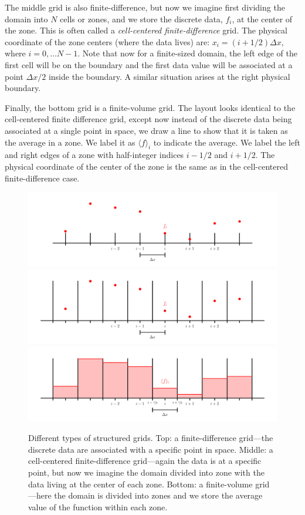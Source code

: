 The middle grid is also finite-difference, but now we imagine first
dividing the domain into $N$ cells or zones, and we store the discrete
data, $f_i$, at the center of the zone.  This is often called a {\em
  cell-centered finite-difference} grid.  The physical coordinate of
the zone centers (where the data lives) are: $x_i = (i + 1/2)\Delta
x$, where $i = 0, \ldots N-1$.  Note that now for a finite-sized
domain, the left edge of the first cell will be on the boundary and
the first data value will be associated at a point $\Delta x/2$ inside
the boundary.  A similar situation arises at the right physical
boundary.

Finally, the bottom grid is a finite-volume grid.  The layout looks
identical to the cell-centered finite difference grid, except now
instead of the discrete data being associated at a single point in
space, we draw a line to show that it is taken as the average in a
zone.  We label it as $\langle f\rangle_i$ to indicate the average.
We label the left and right edges of a zone with half-integer indices
$i-1/2$ and $i+1/2$.  The physical coordinate of the center of the zone
is the same as in the cell-centered finite-difference case.


\begin{figure}[t]
\centering
\includegraphics[width=5.5in]{fd_grid} \\
\includegraphics[width=5.5in]{ccfd_grid} \\
\includegraphics[width=5.5in]{fv_grid}
\caption{\label{fig:grids} Different types of structured grids.  Top:
  a finite-difference grid---the discrete data are associated with a
  specific point in space.  Middle: a cell-centered finite-difference
  grid---again the data is at a specific point, but now we imagine the
  domain divided into zone with the data living at the center of each
  zone.  Bottom: a finite-volume grid---here the domain is divided
  into zones and we store the average value of the function within
  each zone.}
\end{figure}

